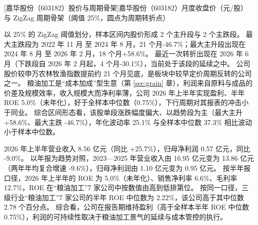\begin{center}
\begin{minipage}{\textwidth}\centering
{}

[嘉华股份（603182）股价与周期骨架]{嘉华股份（603182）月度收盘价（元/股）与 ZigZag 周期骨架（阈值 25\%，圆点为周期转折点）}
\end{minipage}
\end{center}

 以 25\% 的 ZigZag 阈值划分，样本区间内股价形成 2 个主升段与 2 个主跌段。 最大主跌段为 2022 年 11 月 至 2024 年 8 月，21 个月-46.7\%；最大主升段出现在 2024 年 8 月 至 2026 年 2 月，18 个月+58.6\%。 最近一次转折出现在 2026 年 6 月（下跌段自 2026 年 2 月起，4 个月-30.1\%），当前处于该段的延续之中。 公司股价较申万农林牧渔指数提前约 21 个月见底，是板块中较早定价周期反转的公司之一。 粮油加工是“成本加成”型生意（第 \ref{sec:grain} 章），利润来自原料与成品的价差及规模效率，收入规模大而净利率薄，公司 2026 年上半年实现盈利、半年 ROE 5.0\%（未年化），好于全样本中位数（0.75\%），下行周期对其报表的冲击小于同业。 综合区间形态看，该股单段涨跌幅度偏大、以趋势段为主（最大主升 +58.6\%、最大主跌 -46.7\%），年化波动率 25.1\% 与全样本中位数 37.3\% 相比波动小于样本中位数。

 2026 年上半年营业收入 8.56 亿元（同比 +25.7\%），归母净利润 0.57 亿元，同比 -9.0\%。 以年报为趋势对照，2023---2025 年营业收入由 16.95 亿元变为 13.86 亿元（两年年均复合增速 -9.6\%），归母净利润由 1.10 亿元变为 0.95 亿元。 按半年报口径，2026 年上半年的 ROE 为 5.0\%（未年化）、销售净利率 6.6\%、毛利率 12.7\%，ROE 在“粮油加工”7 家公司中按数值由高到低排第位。 按同一口径，三级行业“粮油加工”7 家公司的半年 ROE 中位数为 2.22\%，该公司高于其中位数 2.78 个百分点。 综合看，公司在报告期维持盈利（高于全样本半年 ROE 中位数 0.75\%），利润的可持续性取决于粮油加工景气的延续与成本管控的执行。

